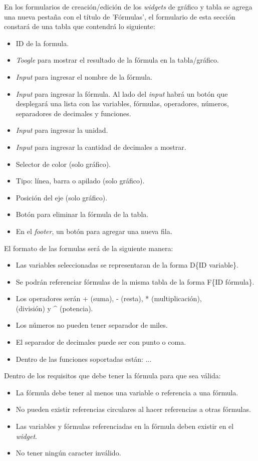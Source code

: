 En los formularios de creación/edición de los \textit{widgets} de gráfico y tabla se agrega una nueva pestaña con el título de 'Fórmulas', el formulario de esta sección constará de una tabla que contendrá lo siguiente:
\begin{itemize}
    \item ID de la formula.
    \item \textit{Toogle} para mostrar el resultado de la fórmula en la tabla/gráfico.
    \item \textit{Input} para ingresar el nombre de la fórmula.
    \item \textit{Input} para ingresar la fórmula. Al lado del \textit{input} habrá un botón que desplegará una lista con las variables, fórmulas, operadores, números, separadores de decimales y funciones.
    \item \textit{Input} para ingresar la unidad.
    \item \textit{Input} para ingresar la cantidad de decimales a mostrar.
    \item Selector de color (solo gráfico).
    \item Tipo: línea, barra o apilado (solo gráfico).
    \item Posición del eje (solo gráfico).
    \item Botón para eliminar la fórmula de la tabla.
    \item En el \textit{footer}, un botón para agregar una nueva fila.
\end{itemize}

El formato de las formulas será de la siguiente manera:
\begin{itemize}
    \item Las variables seleccionadas se representaran de la forma D\{ID variable\}.
    \item Se podrán referenciar fórmulas de la misma tabla de la forma F\{ID fórmula\}.
    \item Los operadores serán + (suma), - (resta), * (multiplicación), \\ (división) y ^ (potencia).
    \item Los números no pueden tener separador de miles.
    \item El separador de decimales puede ser con punto o coma.
    \item Dentro de las funciones soportadas están: ...
\end{itemize}

Dentro de los requisitos que debe tener la fórmula para que sea válida:
\begin{itemize}
    \item La fórmula debe tener al menos una variable o referencia a una fórmula.
    \item No pueden existir referencias circulares al hacer referencias a otras fórmulas.
    \item Las variables y fórmulas referenciadas en la fórmula deben existir en el \textit{widget}.    
    \item No tener ningún caracter inválido.
\end{itemize}

